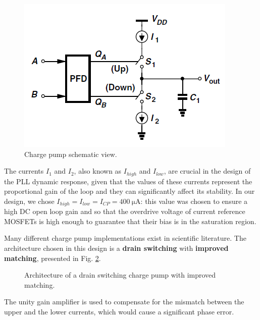 \documentclass[lettersize,journal]{IEEEtran}
\begin{document}
\begin{figure}[!ht]
    \centering
    \includegraphics[width=1\linewidth]{images/block_design/CP/cp_block_view.png}
    \caption{Charge pump schematic view.}
    \label{fig:cp_block_view}
\end{figure}

The currents $I_1$ and $I_2$, also known as $I_{high}$ and $I_{low}$, are crucial in the design of the PLL dynamic response, given that the values of these currents represent the proportional gain of the loop and they can significantly affect its stability. In our design, we chose $I_{high}=I_{low}=I_{CP}=\qty{400}{\micro\ampere}$: this value was chosen to ensure a high DC open loop gain and so that the overdrive voltage of current reference MOSFETs is high enough to guarantee that their bias is in the saturation region.

Many different charge pump implementations exist in scientific literature. The architecture chosen in this design is a \textbf{drain switching} with \textbf{improved matching}, presented in Fig. \ref{fig:cp-architecture}.

\begin{figure}[!ht]
    \centering
    \def\svgwidth{\linewidth}
    
    \caption{Architecture of a drain switching charge pump with improved matching.}
    \label{fig:cp-architecture}
\end{figure}

The unity gain amplifier is used to compensate for the mismatch between the upper and the lower currents, which would cause a significant phase error.
\end{document}
